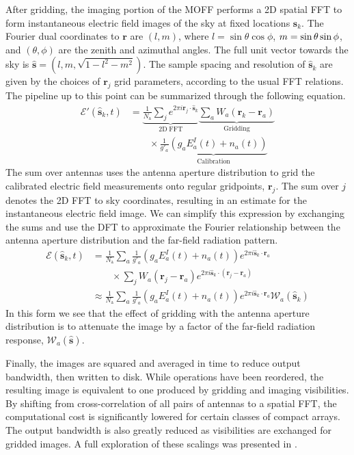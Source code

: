 \documentclass[a4paper,fleqn,usenatbib]{mnras}
\newcommand{\Nant}{\ensuremath{N_{\mathrm{a}}}}
\newcommand{\s}{\ensuremath{\hat{\mathbf{s}}}} %
\newcommand{\ra}{\ensuremath{\mathbf{r}_a}}
\begin{document}
After gridding, the imaging portion of the MOFF performs a 2D spatial FFT to form 
instantaneous electric field images of the sky at fixed locations $\s_k$.
The Fourier dual coordinates to $\mathbf{r}$ are $(l,m)$, where $l=\sin\theta\cos\phi$,
$m=\nobreak\sin\theta\sin\phi$, and $(\theta,\phi)$ are the zenith 
and azimuthal angles. The full unit vector towards the sky is 
$\s=(l,m,\sqrt{1-l^2-m^2})$.
The sample spacing and resolution of $\s_k$ are given 
by the choices of $\mathbf{r}_j$ grid parameters, according to the usual FFT relations.
The pipeline up to this point can be summarized 
through the following equation.
\begin{align}
\mathcal{E}'(\s_k,t) & = \underbrace{\frac{1}{\Nant} \sum_j e^{2\pi i \mathbf{r}_j \cdot \s_k}}_{\mathrm{2D\;FFT}} 
\underbrace{\sum_a W_a(\mathbf{r}_k - \ra)}_{\mathrm{Gridding}} \\
& \qquad \times \underbrace{ \frac{1}{g'_a} \left(g_a E_a^I(t)+n_a(t)\right)}_{\mathrm{Calibration}} \nonumber
\end{align}
The sum over antennas uses the antenna aperture distribution to grid the calibrated electric field measurements onto 
regular gridpoints, $\mathbf{r}_j$. The sum over $j$ denotes the 2D FFT to sky coordinates, resulting in an 
estimate for the instantaneous electric field image. We can simplify this expression by 
exchanging the sums and use the DFT to approximate the Fourier relationship between
the antenna aperture distribution and the far-field radiation pattern.
\begin{align}\label{eq:epix}
\mathcal{E}(\s_k,t) & = \frac{1}{\Nant} \sum_a \frac{1}{g'_a}\left(g_a E^I_a(t)+n_a(t)\right) e^{2\pi i \s_k \cdot \ra} \nonumber \\
  & \qquad\times \sum_j W_a(\mathbf{r}_j-\ra)e^{2\pi i \s_k \cdot (\mathbf{r}_j-\ra)} \nonumber\\
& \approx \frac{1}{\Nant} \sum_a \frac{1}{g'_a}\left(g_aE^I_a(t)+n_a(t)\right) e^{2\pi i \s_k \cdot \ra}\mathcal{W}_a(\s_k)
\end{align}
In this form we see that the effect of gridding with the antenna aperture distribution is to attenuate 
the image by a factor of the far-field radiation response, $\mathcal{W}_a(\s)$.

Finally, the images are squared and averaged in time to reduce output bandwidth, then written 
to disk. While operations have been reordered, the resulting image is equivalent to one 
produced by gridding and imaging visibilities. By shifting from cross-correlation of all pairs of 
antennas to a spatial FFT, the computational cost is significantly lowered for certain classes of 
compact arrays. The output bandwidth is also greatly reduced as visibilities are exchanged for 
gridded images. A full exploration of these scalings was presented in \citealt{thy15c}.
\end{document}
